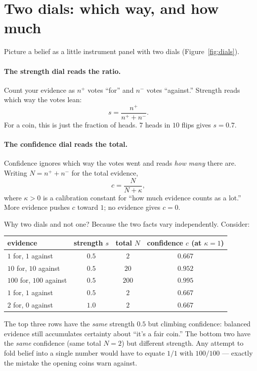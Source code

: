 \documentclass[]{article}
\begin{document}
\section{Two dials: which way, and how much}\label{sec:dials}

Picture a belief as a little instrument panel with two dials
(Figure~\ref{fig:dials}).

\paragraph{The strength dial reads the ratio.} Count your evidence as $n^+$
votes ``for'' and $n^-$ votes ``against.'' Strength reads which way the votes
lean:
\[
  s = \frac{n^+}{n^+ + n^-}.
\]
For a coin, this is just the fraction of heads. $7$ heads in $10$ flips gives
$s = 0.7$.

\paragraph{The confidence dial reads the total.} Confidence ignores which way
the votes went and reads \emph{how many} there are. Writing $N = n^+ + n^-$ for
the total evidence,
\[
  c = \frac{N}{N + \kappa},
\]
where $\kappa>0$ is a calibration constant for ``how much evidence counts as a
lot.'' More evidence pushes $c$ toward $1$; no evidence gives $c=0$.

Why two dials and not one? Because the two facts vary independently. Consider:

\begin{center}
\begin{tabular}{lccc}
\toprule
evidence & strength $s$ & total $N$ & confidence $c$ (at $\kappa=1$)\\
\midrule
$1$ for, $1$ against    & $0.5$ & $2$   & $0.667$\\
$10$ for, $10$ against  & $0.5$ & $20$  & $0.952$\\
$100$ for, $100$ against& $0.5$ & $200$ & $0.995$\\
\midrule
$1$ for, $1$ against    & $0.5$ & $2$ & $0.667$\\
$2$ for, $0$ against    & $1.0$ & $2$ & $0.667$\\
\bottomrule
\end{tabular}
\end{center}

The top three rows have the \emph{same} strength $0.5$ but climbing confidence:
balanced evidence still accumulates certainty about ``it's a fair coin.'' The
bottom two have the \emph{same} confidence (same total $N=2$) but different
strength. Any attempt to fold belief into a single number would have to equate
$1/1$ with $100/100$ --- exactly the mistake the opening coins warn against.
\end{document}
